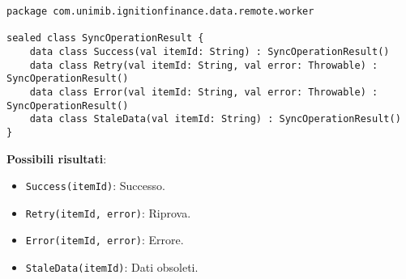 \begin{lstlisting}[caption=SyncOperationResult.kt, label=lst:syncoperationresult, basicstyle=\ttfamily\scriptsize, breaklines=true, breakatwhitespace=true, tabsize=4]
package com.unimib.ignitionfinance.data.remote.worker

sealed class SyncOperationResult {
    data class Success(val itemId: String) : SyncOperationResult()
    data class Retry(val itemId: String, val error: Throwable) : SyncOperationResult()
    data class Error(val itemId: String, val error: Throwable) : SyncOperationResult()
    data class StaleData(val itemId: String) : SyncOperationResult()
}
\end{lstlisting}

\textbf{Possibili risultati}:
\begin{itemize}
    \item \texttt{Success(itemId)}: Successo.
    \item \texttt{Retry(itemId, error)}: Riprova.
    \item \texttt{Error(itemId, error)}: Errore.
    \item \texttt{StaleData(itemId)}: Dati obsoleti.
\end{itemize}